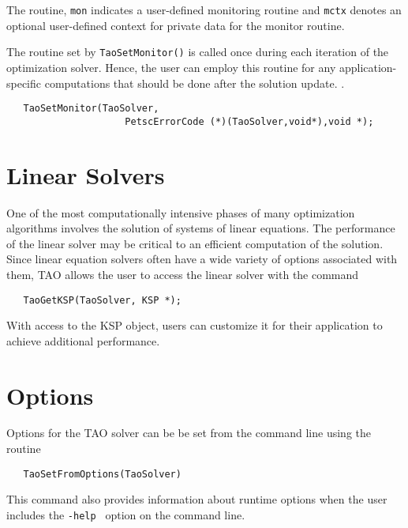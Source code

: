 The routine, {\tt mon} indicates a user-defined monitoring routine
and {\tt mctx} denotes an optional user-defined context for private 
data for the monitor routine.

The routine set by {\tt TaoSetMonitor()} is called once during each
iteration of the optimization solver.  Hence, the
user can employ this routine for any application-specific computations
that should be done after the solution update. 
.
\begin{verbatim}
   TaoSetMonitor(TaoSolver,
                     PetscErrorCode (*)(TaoSolver,void*),void *);
\end{verbatim}



\section{Linear Solvers}\label{sec:TaoLinearSolvers}
One of the most computationally intensive phases of many optimization
algorithms involves the solution of systems of linear equations.  
The performance
of the linear solver may be critical to an efficient computation
of the solution.
Since linear equation solvers often have a wide variety of options 
associated with them, TAO allows the user to access the linear
solver with the command

\begin{verbatim}
   TaoGetKSP(TaoSolver, KSP *);
\end{verbatim}

\noindent
With access to the KSP object, users can customize it for their application
to achieve additional performance.


\section{Options}
Options for the TAO solver 
can be be set from the command line using the routine  
\begin{verbatim}
   TaoSetFromOptions(TaoSolver)
\end{verbatim}
This command also provides information about runtime options when the
user includes the {\tt -help } option on the
command line.

